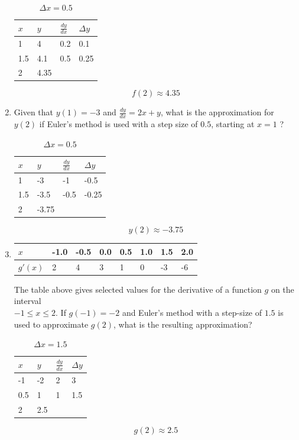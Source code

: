 \documentclass[12pt]{article}
\begin{document}
\begin{enumerate}
\begin{table}[H]
\caption{$\Delta x = 0.5$}
\centering \label{table_example}
\begin{tabular}{l|lll}
$x$ & \multicolumn{1}{l|}{$y$} & \multicolumn{1}{l|}{$\frac{dy}{dx}$} & $\Delta y$ \\ \hline
1 & 4 & 0.2 & 0.1 \\
1.5 & 4.1 & 0.5 & 0.25 \\
2 & 4.35 &  & 
\end{tabular}
\end{table}
$$\boxed{f(2)\approx 4.35}$$

\item Given that $y(1) =-3$ and $\frac{dy}{dx}=2x+y$, what is the approximation for $y(2)$ if Euler’s method is used with a step size of $0.5$, starting at $x = 1$ ?

\begin{table}[H]
\caption{$\Delta x = 0.5$}
\centering \label{table_example}
\begin{tabular}{l|lll}
$x$ & \multicolumn{1}{l|}{$y$} & \multicolumn{1}{l|}{$\frac{dy}{dx}$} & $\Delta y$ \\ \hline
1 & -3 & -1 & -0.5 \\
1.5 & -3.5 & -0.5 & -0.25 \\
2 & -3.75 &  & 
\end{tabular}
\end{table}
$$\boxed{y(2) \approx -3.75}$$


\item 
\begin{table}[H]
\centering
\begin{tabular}{l|lllllll}
$x$     & -1.0 & -0.5 & 0.0 & 0.5 & 1.0 & 1.5 & 2.0 \\ \hline
$g'(x)$ & 2    & 4    & 3   & 1   & 0   & -3  & -6 
\end{tabular}
\end{table}

The table above gives selected values for the derivative of a function $g$ on the interval \\ $ -1 \leq x \leq 2$. If $g(-1) = -2$ and Euler’s method with a step-size of $1.5$ is used to approximate $g(2)$, what is the resulting approximation?

\begin{table}[H]
\caption{$\Delta x = 1.5$}
\centering \label{table_example}
\begin{tabular}{l|lll}
$x$ & \multicolumn{1}{l|}{$y$} & \multicolumn{1}{l|}{$\frac{dy}{dx}$} & $\Delta y$ \\ \hline
-1 & -2 & 2 & 3 \\
0.5 & 1 & 1 & 1.5 \\
2 & 2.5 &  & 
\end{tabular}
\end{table}
$$\boxed{g(2) \approx 2.5}$$


\end{enumerate}
\end{document}
